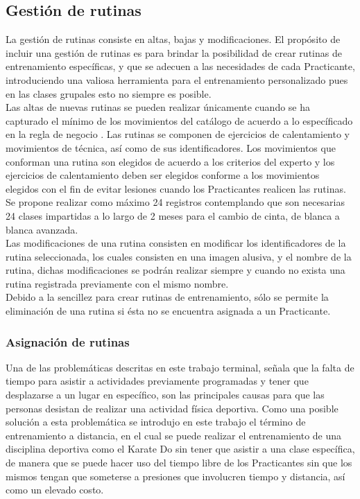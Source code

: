 \subsection{Gestión de rutinas}

La gestión de rutinas consiste en altas, bajas y modificaciones. El propósito de incluir una gestión de rutinas es para brindar la posibilidad de crear rutinas de entrenamiento específicas, y que se adecuen a las necesidades de cada Practicante, introduciendo una valiosa herramienta para el entrenamiento personalizado pues en las clases grupales esto no siempre es posible.\\

Las altas de nuevas rutinas se pueden realizar únicamente cuando se ha capturado el mínimo de los movimientos del catálogo de acuerdo a lo específicado en la regla de negocio . Las rutinas se componen de ejercicios de calentamiento y movimientos de técnica, así como de sus identificadores. Los movimientos que conforman una rutina son elegidos de acuerdo a los criterios del experto y los ejercicios de calentamiento deben ser elegidos conforme a los movimientos elegidos con el fin de evitar lesiones cuando los Practicantes realicen las rutinas. Se propone realizar como máximo 24 registros contemplando que son necesarias 24 clases impartidas a lo largo de 2 meses para el cambio de cinta, de blanca a blanca avanzada.\\

Las modificaciones de una rutina consisten en modificar los identificadores de la rutina seleccionada, los cuales consisten en una imagen alusiva, y el nombre de la rutina, dichas modificaciones se podrán realizar siempre y cuando no exista una rutina registrada previamente con el mismo nombre.\\

Debido a la sencillez para crear rutinas de entrenamiento, sólo se permite la eliminación de una rutina si ésta no se encuentra asignada a un Practicante.\\

\subsubsection{Asignación de rutinas}

Una de las problemáticas descritas en este trabajo terminal, señala que la falta de tiempo para asistir a actividades previamente programadas y tener que desplazarse a un lugar en específico, son las principales causas para que las personas desistan de realizar una actividad física deportiva. Como una posible solución a esta problemática se introdujo en este trabajo el término de entrenamiento a distancia, en el cual se puede realizar el entrenamiento de una disciplina deportiva como el Karate Do sin tener que asistir a una clase específica, de manera que se puede hacer uso del tiempo libre de los Practicantes sin que los mismos tengan que someterse a presiones que involucren tiempo y distancia, así como un elevado costo. \\

